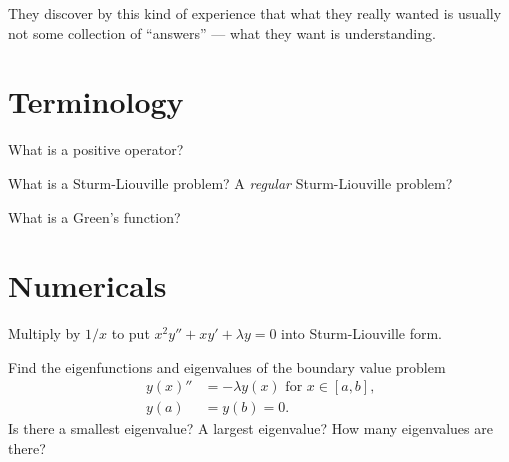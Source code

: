 \documentclass{homework}
\author{Jim Fowler}
\begin{document}
\maketitle

\begin{inspiration}
They discover by this kind of experience that what they really wanted is usually not some collection of ``answers'' --- what they want is understanding.
\end{inspiration}

\section{Terminology}

\begin{problem}
  What is a positive operator?
\end{problem}

\begin{problem}
  What is a Sturm-Liouville problem?  A \textit{regular} Sturm-Liouville problem?
\end{problem}

\begin{problem}
  What is a Green's function?
\end{problem}






\section{Numericals}

\begin{problem}
  Multiply by $1/x$ to put $x^2 y'' + xy' + \lambda y = 0$  into Sturm-Liouville form.
\end{problem}

\begin{problem}\label{wave-with-fixed-endpoints}Find the eigenfunctions and eigenvalues of the boundary value problem
  \begin{align*}
    y(x)'' &= - \lambda y(x) \mbox{ for $x \in [a,b]$,} \\
    y(a) &= y(b) = 0.
  \end{align*}
  Is there a smallest eigenvalue?  A largest eigenvalue?  How many
  eigenvalues are there?
\end{problem}
\end{document}
